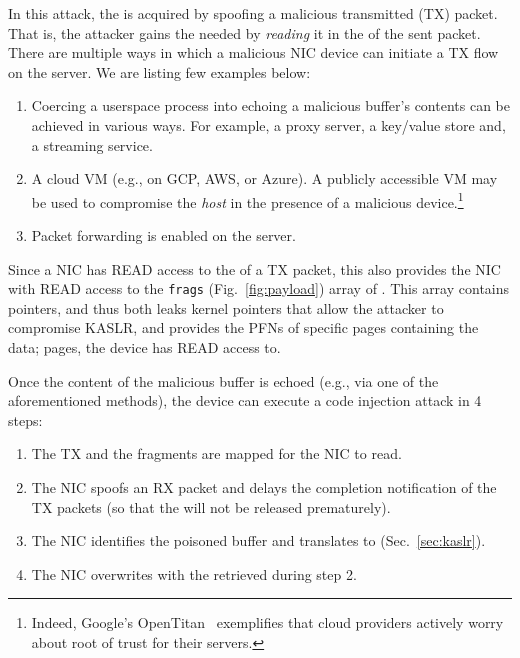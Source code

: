 In this attack, the \kva is acquired by spoofing a malicious transmitted (TX) packet. That is, the attacker gains the needed \kva by \emph{reading} it in the \shinfo of the sent packet. 
%
There are multiple ways in which a malicious NIC device can initiate a TX flow on the server. We are listing few examples below:
\begin{enumerate}
    \item Coercing a userspace process into echoing a malicious buffer's contents can be achieved in various ways. For example, a proxy server, a key/value store and, a streaming service.
    \item A cloud VM (e.g., on GCP, AWS, or Azure). A publicly accessible VM may be used to compromise the \emph{host} in the presence of a malicious device.\footnote{Indeed, Google's OpenTitan~\cite{opentitan} exemplifies that cloud providers actively worry about root of trust for their servers.}
    \item Packet forwarding is enabled on the server.
\end{enumerate}
Since a NIC has READ access to the \shinfo{} of a TX packet, this also provides the NIC with READ access to the \texttt{frags} (Fig.~\ref{fig:payload}) array of \shinfo{}. This array contains \page{} pointers, and thus both leaks kernel pointers that allow the attacker to compromise KASLR, and provides the PFNs of specific pages containing the data; pages, the device has READ access to.


Once the content of the malicious buffer is echoed (e.g., via one of the aforementioned methods), the device can execute a code injection attack in 4 steps:  
%
\begin{enumerate}[labelindent=3pt]
    \item The TX \data{} and the fragments are mapped for the NIC to read.
    \item The NIC spoofs an RX packet and delays the completion notification of the TX packets (so that the \mabaf{} will not be released prematurely).
    \item The NIC identifies the poisoned buffer and translates \page{} to \kva{} (Sec.~\ref{sec:kaslr}).
    \item The NIC overwrites \shinfo{} with the \kva{} retrieved during step 2. 
\end{enumerate}

